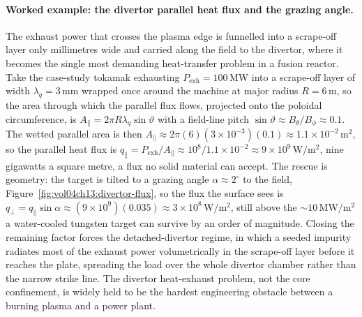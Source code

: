\paragraph{Worked example: the divertor parallel heat flux and the grazing angle.}
The exhaust power that crosses the plasma edge is funnelled into a scrape-off
layer only millimetres wide and carried along the field to the divertor, where it
becomes the single most demanding heat-transfer problem in a fusion reactor.
Take the case-study tokamak exhausting $P_{\mathrm{exh}} = 100\,\si{\mega\watt}$
into a scrape-off layer of width $\lambda_q = 3\,\si{\milli\meter}$ wrapped once
around the machine at major radius $R = 6\,\si{\meter}$, so the area through
which the parallel flux flows, projected onto the poloidal circumference, is $A_\parallel
= 2\pi R\lambda_q\sin\vartheta$ with a field-line pitch $\sin\vartheta \approx
B_\theta/B_\phi \approx 0.1$. The wetted parallel area is then $A_\parallel
\approx 2\pi(6)(3\times 10^{-3})(0.1) \approx 1.1\times 10^{-2}\,\si{\meter
\squared}$, so the parallel heat flux is $q_\parallel = P_{\mathrm{exh}}/
A_\parallel \approx 10^{8}/1.1\times 10^{-2} \approx 9\times 10^{9}\,\si{\watt
\per\meter\squared}$, nine gigawatts a square metre, a flux no solid material
can accept. The rescue is geometry: the target is tilted to a grazing angle
$\alpha \approx 2^{\circ}$ to the field, Figure~\ref{fig:vol04ch13:divertor-flux},
so the flux the surface sees is $q_\perp = q_\parallel\sin\alpha \approx
(9\times 10^{9})(0.035) \approx 3\times 10^{8}\,\si{\watt\per\meter\squared}$,
still above the $\sim 10\,\si{\mega\watt\per\meter\squared}$ a water-cooled
tungsten target can survive by an order of magnitude. Closing the remaining
factor forces the detached-divertor regime, in which a seeded impurity radiates
most of the exhaust power volumetrically in the scrape-off layer before it
reaches the plate, spreading the load over the whole divertor chamber rather
than the narrow strike line. The divertor heat-exhaust problem, not the core
confinement, is widely held to be the hardest engineering obstacle between a
burning plasma and a power plant.

